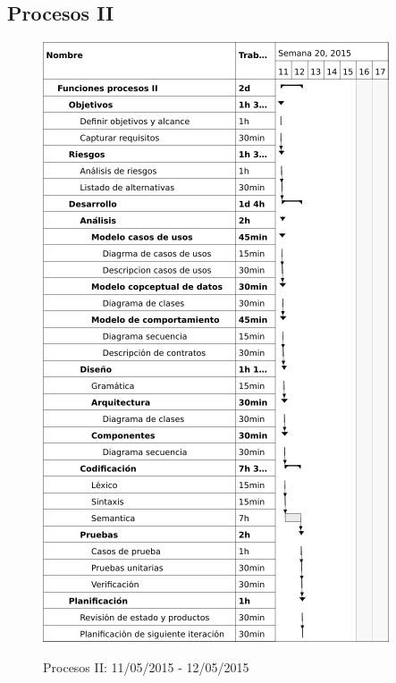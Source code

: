 \subsection{Procesos II}
\begin{center}
\begin{figure}[H]
\centering
\includegraphics[scale=1]{planning/27-funciones-procesos-ii.png} \\
\caption{Procesos II: 11/05/2015 - 12/05/2015 }
\end{figure}
\end{center}

